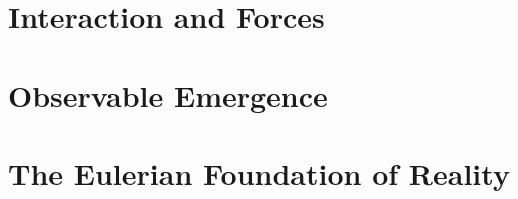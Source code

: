 \documentclass[12pt, oneside]{book}
\theoremstyle{definition}
\begin{document}
\part{Interaction and Forces}










\part{Observable Emergence}








\part{The Eulerian Foundation of Reality}







\appendix
% 
% 
\end{document}
